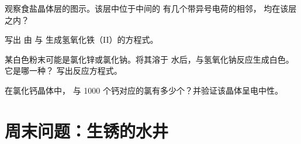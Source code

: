\begin{exercise}[$\star\star$]\label{exo:g9:ions:9}
观察食盐晶体层的图示。该层中位于中间的
有几个带异号电荷的相邻，
均在该层之内？
\end{exercise}

\begin{exercise}[$\star\star$]\label{exo:g9:ions:10}
写出
由  与  生成氢氧化铁（II）的方程式。
\end{exercise}

\begin{exercise}[$\star\star\star$]\label{exo:g9:ions:11}
某白色粉末可能是氯化锌或氯化钠。将其溶于
水后，与氢氧化钠反应生成白色。它是哪一种？
写出反应方程式。
\end{exercise}

\begin{exercise}[$\star\star\star$]\label{exo:g9:ions:12}
在氯化钙晶体中，
与 1000 个钙对应的氯有多少个？并验证该晶体呈电中性。
\end{exercise}

\section{周末问题：生锈的水井}

